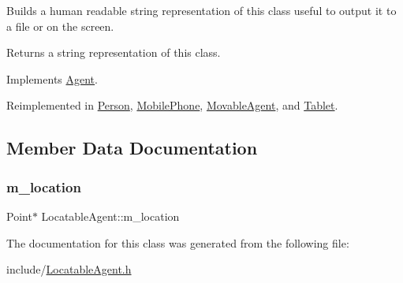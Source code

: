 Builds a human readable string representation of this class useful to output it to a file or on the screen. \begin{DoxyReturn}{Returns}
a string representation of this class. 
\end{DoxyReturn}


Implements \hyperlink{class_agent_a44f291596d10c7878b0641d6ec156328}{Agent}.



Reimplemented in \hyperlink{class_person_a68872538da519d0a04297f43376db27c}{Person}, \hyperlink{class_mobile_phone_a2b7e556d12a43e380786ad0eccf3ce04}{Mobile\+Phone}, \hyperlink{class_movable_agent_a1dee2a6bf93f01006fadfb6fba6c9a59}{Movable\+Agent}, and \hyperlink{class_tablet_a3fae01e7d526699476221c6a686a4fba}{Tablet}.



\subsection{Member Data Documentation}
\mbox{\label{class_locatable_agent_a2a76ba315733ab26f19229a71071704d}} 
\subsubsection{\texorpdfstring{m\+\_\+location}{m\_location}}
{\footnotesize\ttfamily Point$\ast$ Locatable\+Agent\+::m\+\_\+location\hspace{0.3cm}{\ttfamily [private]}}



The documentation for this class was generated from the following file\+:\begin{DoxyCompactItemize}
\item 
include/\hyperlink{_locatable_agent_8h}{Locatable\+Agent.\+h}\end{DoxyCompactItemize}
